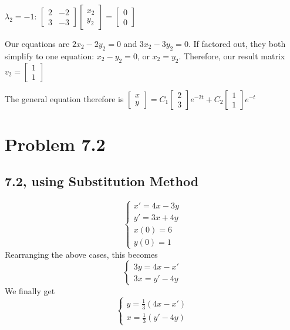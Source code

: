 \documentclass{article}
\begin{document}
\noindent $\lambda_{2} = -1$: 
$\begin{bmatrix}
    2 & -2 \\
    3 & -3
\end{bmatrix}
\begin{bmatrix}
    x_{2} \\
    y_{2}
\end{bmatrix}
=
\begin{bmatrix}
    0 \\
    0
\end{bmatrix}
$ \par
\noindent Our equations are $2x_{2} - 2y_{2} = 0$ and $3x_{2} - 3y_{2} = 0$.  If factored out, they both simplify to one equation: $x_{2} - y_{2} = 0$, or $x_{2} = y_{2}$.  Therefore, our result matrix $v_{2} = \begin{bmatrix}
    1 \\
    1
\end{bmatrix}$ \par\vspace{0.25cm}

\noindent The general equation therefore is $\begin{bmatrix}
    x \\
    y
\end{bmatrix}
=
C_{1}\begin{bmatrix}
    2 \\
    3
\end{bmatrix}
e^{-2t} +
C_{2}\begin{bmatrix}
    1 \\
    1
\end{bmatrix}
e^{-t}
$

\section{Problem 7.2}

\subsection{7.2, using Substitution Method}
\noindent $$
\begin{cases}
x' = 4x - 3y\\
y' = 3x + 4y\\
x(0) = 6 \\
y(0) = 1
\end{cases}
$$Rearranging the above cases, this becomes $$
\begin{cases}
3y = 4x - x'\\
3x = y' - 4y
\end{cases}
$$ We finally get $$
\begin{cases}
y = \frac{1}{3}(4x - x')\\
x = \frac{1}{3}(y' - 4y)
\end{cases}
$$
\end{document}
